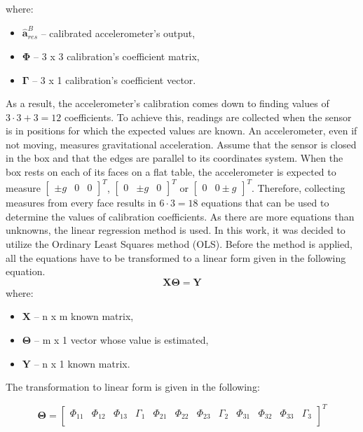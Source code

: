 where:
\begin{itemize}
	\item $\bm{\hat{a}}_{res}^B$ -- calibrated accelerometer's output,
	\item $\bm{\Phi}$ -- 3 x 3 calibration's coefficient matrix,
	\item $\bm{\Gamma}$ -- 3 x 1 calibration's coefficient vector.
\end{itemize}
As a result, the accelerometer’s calibration comes down to finding values of $3 \cdot 3 + 3 = 12$ coefficients. To achieve this, readings are collected when the sensor is in positions for which the expected values are known. An accelerometer, even if not moving, measures gravitational acceleration. Assume that the sensor is closed in the box and that the edges are parallel to its coordinates system. When the box rests on each of its faces on a flat table, the accelerometer is expected to measure $\begin{bmatrix}\pm g & 0 & 0\end{bmatrix}^T$, $\begin{bmatrix}0 & \pm g & 0\end{bmatrix}^T$ or $\begin{bmatrix} 0 & 0 \pm g\end{bmatrix}^T$. Therefore, collecting measures from every face results in $6 \cdot 3 = 18$ equations that can be used to determine the values of calibration coefficients. As there are more equations than unknowns, the linear regression method is used. In this work, it was decided to utilize the Ordinary Least Squares method (OLS). Before the method is applied, all the equations have to be transformed to a linear form given in the following equation.
\begin{equation}
	\bm{X} \bm{\Theta} = \bm{Y}
	\label{ols}
\end{equation}
where:
\begin{itemize}
	\item $\bm{X}$ -- n x m known matrix,
	\item $\bm{\Theta}$ -- m x 1 vector whose value is estimated,
	\item $\bm{Y}$ -- n x 1 known matrix.
\end{itemize}
 
The transformation to linear form is given in the following:
\setcounter{MaxMatrixCols}{25}

\begin{equation}
	\bm{\Theta} = \begin{bmatrix} \Phi_{11} & \Phi_{12} & \Phi_{13} & \Gamma_1 & \Phi_{21} & \Phi_{22} & \Phi_{23} & \Gamma_2 & \Phi_{31} & \Phi_{32} & \Phi_{33} & \Gamma_3 \\
	\end{bmatrix}^T
	\label{ols_theta}
\end{equation}


